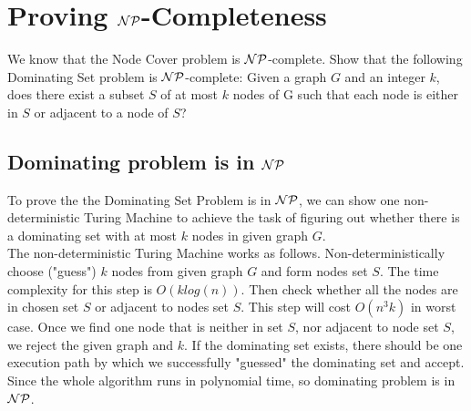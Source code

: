 \documentclass[11pt,a4paper]{article}
\newcommand{\htab}{\hspace*{0.63cm}}
\begin{document}
\section{Proving $\mathcal{NP}$-Completeness}
We know that the Node Cover problem is $\mathcal{NP}$-complete.
Show that the following Dominating Set problem is $\mathcal{NP}$-complete: Given a graph $G$ 
and an integer $k$, does there exist a subset $S$ of at most $k$ nodes of G such that 
each node is either in $S$ or adjacent to a node of $S$? 
\subsection{Dominating problem is in $\mathcal{NP}$}
\htab To prove the the Dominating Set Problem is in $\mathcal{NP}$, we can show one non-deterministic Turing Machine to achieve
the task of figuring out whether there is a dominating set with at most $k$ nodes in given graph $G$. \\
\htab The non-deterministic Turing Machine works as follows. Non-deterministically choose ("guess") $k$ nodes from given graph $G$ and form nodes set $S$. The time complexity for this step is $O(klog(n))$. Then check whether all the nodes are in chosen set $S$ or adjacent to nodes set $S$. This step will cost $O(n^{3}k)$ in worst case. Once we find one node that is neither in set $S$, nor adjacent to node set $S$, we reject the given graph and $k$. If the dominating set exists, there should be one execution path by which we successfully "guessed" the dominating set and accept. Since the whole algorithm runs in polynomial time, so dominating problem is in $\mathcal{NP}$.
\end{document}
